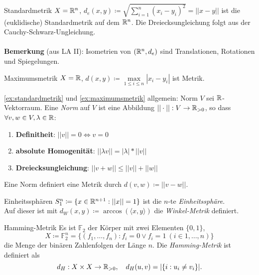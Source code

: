 \begin{example}{Standardmetrik}
  \label{ex:standardmetrik}
  $ X = \mathbb{R}^n $, $ d_e(x, y) \coloneqq \sqrt{\sum_{i=1}^n(x_i-y_i)^2} = ||x-y|| $ ist die (euklidische) Standardmetrik auf dem $ \mathbb{R}^n $. Die Dreiecksungleichung folgt aus der Cauchy-Schwarz-Ungleichung. \\ \ \\
  \textbf{Bemerkung} (aus LA II): Isometrien von $ (\mathbb{R}^n, d_e) $ sind Translationen, Rotationen und Spiegelungen.
\end{example}

\clearpage

\begin{example}{Maximumsmetrik}
  \label{ex:maximumsmetrik}
  $ X = \mathbb{R} $, $ d(x, y) \coloneqq \underset{1 \leq i \leq n}{\max} |x_i-y_i| $ ist Metrik.
\end{example}

\begin{example}{\autoref{ex:standardmetrik} und \autoref{ex:maximumsmetrik} allgemein: Norm}
  $ V $ sei $ \mathbb{R} $-Vektorraum. Eine \emph{Norm} auf $ V $ ist eine Abbildung $ ||\cdot|| : V \to \mathbb{R}_{>0} $, so dass $ \forall v, w \in V, \lambda \in \mathbb{R} $:
  \begin{enumerate}
    \item \textbf{Definitheit}: $ ||v|| = 0 \Leftrightarrow v = 0 $
    \item \textbf{absolute Homogenität}: $ ||\lambda v|| = |\lambda| * ||v|| $
    \item \textbf{Dreiecksungleichung}: $ ||v+w|| \leq ||v||+||w|| $
  \end{enumerate}
  Eine Norm definiert eine Metrik durch $ d(v, w) \coloneqq ||v-w|| $.
\end{example}

\begin{example}{Einheitssphären}
  $ S_1^n \coloneqq \{ x \in \mathbb{R}^{n+1} : ||x|| = 1 \} $  ist die $ n $-te \emph{Einheitssphäre}. \\
  Auf dieser ist mit $ d_W(x, y) \coloneqq \arccos(\langle x, y \rangle) $ die \emph{Winkel-Metrik} definiert.
\end{example}

\begin{example}{Hamming-Metrik}
  Es ist $ \mathbb{F}_2 $ der Körper mit zwei Elementen $ \{ 0, 1 \} $,
  \begin{equation*}
    X \coloneqq \mathbb{F}_2^n = \{ (f_1, \dots, f_n) : f_i = 0 \vee f_i = 1 \ (i \in {1, \dots, n}) \}
  \end{equation*}
  die Menge der binären Zahlenfolgen der Länge $ n $. Die \emph{Hamming-Metrik} ist definiert als
  \begin{equation*}
    d_H: X \times X \to \mathbb{R}_{>0}, \quad d_H(u,v) = |\{ i : u_i \neq v_i \}|\text{.}
  \end{equation*}
\end{example}